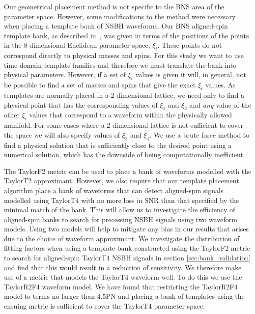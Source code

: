 Our geometrical placement method is not specific to the \ac{BNS} area of the
parameter space. However, some modifications to the method were necessary when
placing a template bank of \ac{NSBH} waveforms. Our \ac{BNS} aligned-spin
template bank, as described in~\cite{Brown:2012qf}, was given in terms of the
positions of the points in the 8-dimensional Euclidean parameter space, $\xi_i$.
These points do not correspond directly to physical masses and spins. For this
study we want to use time domain template families and therefore we
must translate the bank into physical parameters. However, if a set of $\xi_i$ 
values is given it will, in general, not be possible to find a set of masses 
and spins that give the exact $\xi_i$ values. As 
templates are normally placed in a 2-dimensional lattice, we need only to 
find a physical point that has the corresponding values of $\xi_1$ and $\xi_2$ 
and \emph{any} value of the other $\xi_i$ values that correspond to a waveform 
within the physically allowed manifold. For some cases where a 2-dimensional 
lattice is not sufficient to cover the space we will also specify values of 
$\xi_3$ and $\xi_4$. We use a brute force method to find a 
physical solution that is sufficiently close to the desired point using a
numerical solution, which has the downside of being computationally inefficient. 

The TaylorF2 metric can be used to place a bank of waveforms modelled with the
TaylorT2 approximant. However, we also require that our template placement
algorithm place a bank of waveforms that can detect aligned-spin signals
modelled using TaylorT4 with no more loss in \ac{SNR} than that specified by 
the minimal match of the bank. This will allow us to investigate the efficiency 
of aligned-spin banks to search for precessing \ac{NSBH} signals using two 
waveform models. Using two models will help to mitigate any bias in our 
results that arises due to the choice of waveform approximant.
We investigate the distribution of fitting factors when using a template bank
constructed using the TaylorF2 metric to search for aligned-spin TaylorT4
\ac{NSBH} signals in section \ref{sec:bank_validation} and find that this would
result in a reduction of sensitivity. We therefore make use of
a metric that models the TaylorT4 waveform well. To do this we use the
TaylorR2F4 waveform model. We have found that restricting the TaylorR2F4 model
to terms no larger than 4.5\ac{PN} and placing a bank of templates using the
ensuing metric is sufficient to cover the TaylorT4 parameter space.

